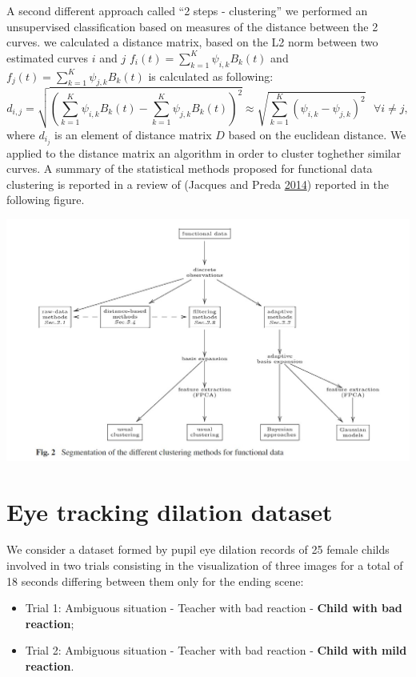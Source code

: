 \documentclass[]{article}
\begin{document}
A second different approach called ``2 steps - clustering'' we performed
an unsupervised classification based on measures of the distance between
the 2 curves. we calculated a distance matrix, based on the L2 norm
between two estimated curves \(i\) and \(j\)
\(f_i(t)=\sum_{k=1}^K \psi_{i,k} B_k(t)\) and
\(f_j(t)=\sum_{k=1}^K \psi_{j,k} B_k(t)\) is calculated as following:
\begin{equation}\label{eq:2stepsfun}
d_{i,j}= \sqrt{(\sum_{k=1}^K \psi_{i,k} B_k(t)-\sum_{k=1}^K \psi_{j,k} B_k(t))^2 }\approx \sqrt{\sum_{k=1}^K (\psi_{i,k}-\psi_{j,k})^2}  \mbox{   } \forall i \neq j,
 \end{equation} where \(d_{i_j}\) is an element of distance matrix \(D\)
based on the euclidean distance. We applied to the distance matrix an
algorithm in order to cluster toghether similar curves. A summary of the
statistical methods proposed for functional data clustering is reported
in a review of (Jacques and Preda
\protect\hyperlink{ref-jacques2014}{2014}) reported in the following
figure.

\includegraphics{fig2_preda.jpg}

\section{Eye tracking dilation dataset}

We consider a dataset formed by pupil eye dilation records of 25 female
childs involved in two trials consisting in the visualization of three
images for a total of 18 seconds differing between them only for the
ending scene:

\begin{itemize}
\item Trial 1: Ambiguous situation - Teacher with bad reaction - \textbf{Child with bad reaction};
\item Trial 2: Ambiguous situation - Teacher with bad reaction - \textbf{Child with mild reaction}.
\end{itemize}
\end{document}
